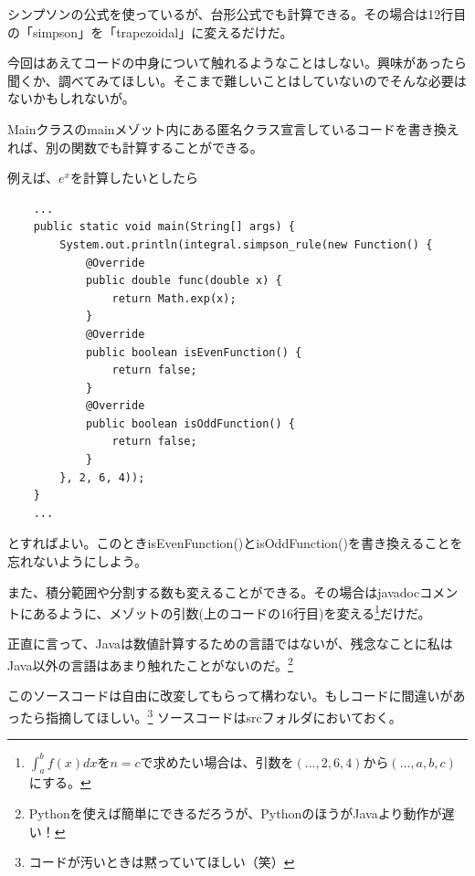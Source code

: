 \documentclass[a4j,dvipdfmx]{jsarticle}
\begin{document}
シンプソンの公式を使っているが、台形公式でも計算できる。その場合は12行目の「simpson」を「trapezoidal」に変えるだけだ。

今回はあえてコードの中身について触れるようなことはしない。興味があったら聞くか、調べてみてほしい。そこまで難しいことはしていないのでそんな必要はないかもしれないが。
\newpage

Mainクラスのmainメゾット内にある匿名クラス宣言しているコードを書き換えれば、別の関数でも計算することができる。

例えば、$e^x$を計算したいとしたら

\begin{lstlisting}
    ...
    public static void main(String[] args) {
        System.out.println(integral.simpson_rule(new Function() {
            @Override
            public double func(double x) {
                return Math.exp(x);
            }   
            @Override
            public boolean isEvenFunction() {
                return false;
            }
            @Override
            public boolean isOddFunction() {
                return false;
            }
        }, 2, 6, 4));
    }
    ...
\end{lstlisting}
とすればよい。このときisEvenFunction()とisOddFunction()を書き換えることを忘れないようにしよう。

また、積分範囲や分割する数も変えることができる。その場合はjavadocコメントにあるように、メゾットの引数(上のコードの16行目)を変える\footnote{$\int_a^b f(x)dx$を$n=c$で求めたい場合は、引数を$(...,2,6,4)$から$(...,a,b,c)$にする。}だけだ。

正直に言って、Javaは数値計算するための言語ではないが、残念なことに私はJava以外の言語はあまり触れたことがないのだ。\footnote{Pythonを使えば簡単にできるだろうが、PythonのほうがJavaより動作が遅い！}

このソースコードは自由に改変してもらって構わない。もしコードに間違いがあったら指摘してほしい。\footnote{コードが汚いときは黙っていてほしい（笑）}
ソースコードはsrcフォルダにおいておく。
\end{document}
